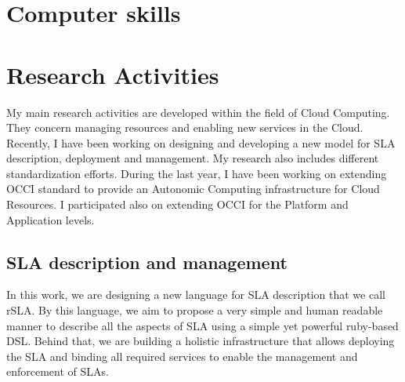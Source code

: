 \documentclass[11pt,a4paper,sans]{moderncv}   %
\begin{document}
 


\section{Computer skills}

\section{Research Activities}
My main research activities are developed within the field of Cloud Computing. They concern managing resources and enabling new services in the 
Cloud. Recently, I have been working on designing and developing a new model for SLA description, deployment and management. My research also 
includes different standardization efforts. During the last year, I have been working on extending OCCI standard to provide an Autonomic 
Computing infrastructure for Cloud Resources. I participated also on extending OCCI for the Platform and Application levels. 
\subsection{SLA description and management}
In this work, we are designing a new language for SLA description that we call rSLA. By this language, we aim to propose a very simple and human 
readable manner to describe all the aspects of SLA using a simple yet powerful ruby-based DSL. Behind that, we are building a holistic infrastructure 
that allows deploying the SLA and binding all required services to enable the management and enforcement of SLAs.
\end{document}
